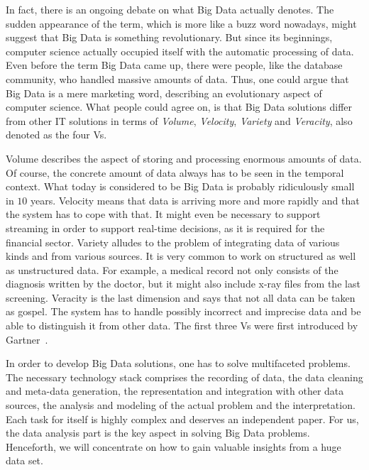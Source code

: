In fact, there is an ongoing debate on what Big Data actually denotes.
The sudden appearance of the term, which is more like a buzz word nowadays, might suggest that Big Data is something revolutionary.
But since its beginnings, computer science actually occupied itself with the automatic processing of data.
Even before the term Big Data came up, there were people, like the database community, who handled massive amounts of data.
Thus, one could argue that Big Data is a mere marketing word, describing an evolutionary aspect of computer science.
What people could agree on, is that Big Data solutions differ from other IT solutions in terms of \emph{Volume}, \emph{Velocity}, \emph{Variety} and \emph{Veracity}, also denoted as the four Vs.

Volume describes the aspect of storing and processing enormous amounts of data.
Of course, the concrete amount of data always has to be seen in the temporal context.
What today is considered to be Big Data is probably ridiculously small in $10$ years.
Velocity means that data is arriving more and more rapidly and that the system has to cope with that.
It might even be necessary to support streaming in order to support real-time decisions, as it is required for the financial sector.
Variety alludes to the problem of integrating data of various kinds and from various sources.
It is very common to work on structured as well as unstructured data.
For example, a medical record not only consists of the diagnosis written by the doctor, but it might also include x-ray files from the last screening.
Veracity is the last dimension and says that not all data can be taken as gospel.
The system has to handle possibly incorrect and imprecise data and be able to distinguish it from other data.
The first three Vs were first introduced by Gartner~\cite{gartner}.

In order to develop Big Data solutions, one has to solve multifaceted problems.
The necessary technology stack comprises the recording of data, the data cleaning and meta-data generation, the representation and integration with other data sources, the analysis and modeling of the actual problem and the interpretation.
Each task for itself is highly complex and deserves an independent paper.
For us, the data analysis part is the key aspect in solving Big Data problems.
Henceforth, we will concentrate on how to gain valuable insights from a huge data set.

